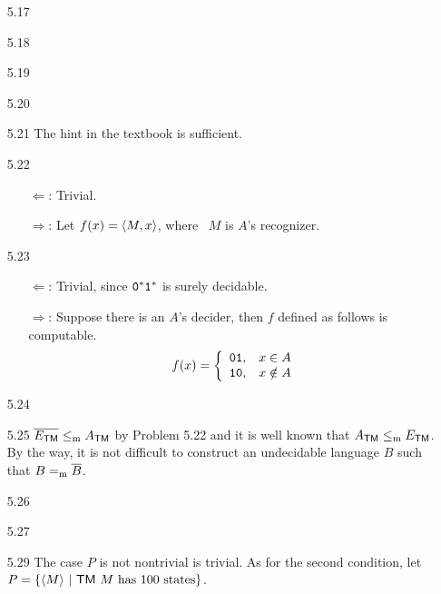 \begin{itemize}
	\item[5.17]
	\Empty
	
	\item[5.18]
	\Empty
	
	\item[5.19]
	\Empty
	
	\item[5.20]
	\Empty
	
	\item[5.21]
	The hint in the textbook is sufficient.
	
	\item[5.22]
	\begin{itemize}
		\item[$\Leftarrow$:] Trivial.
		\item[$\Rightarrow$:] Let $f(x) = \Bra{M, x}$, where \TM\ $M$ is $A$'s recognizer. 
	\end{itemize}

	\item[5.23]
	\begin{itemize}
		\item[$\Leftarrow$:] Trivial, since $\TT{0}^*\TT{1}^*$ is surely decidable.
		\item[$\Rightarrow$:] Suppose there is an $A$'s decider, then $f$ defined as follows is computable.
		\[
			f(x) = 
			\left\{
				\begin{array}{ll}
					\TT{01}, & x \in A \\
					\TT{10}, & x \notin A
				\end{array}
			\right.
		\]
	\end{itemize}

	\item[5.24]
	\Empty
	
	\item[5.25]
	$\overline{E_{\TM}} \Leqm A_{\TM}$ by Problem 5.22 and it is well known that $A_{\TM} \Leqm E_{\TM}$. By the way, it is not difficult to construct an undecidable language $B$ such that $B =_{\RM{m}} \overline{B}$.
	
	\item[5.26]
	\Empty
	
	\item[5.27]
	\Empty
	
	\item[\Star 5.28]
	\Omit
	
	\item[5.29]
	The case $P$ is not nontrivial is trivial. As for the second condition, let $P = \{ \Bra{M} \ | \ \TM\ M \text{ has $100$ states} \}$.
	

\end{itemize}
